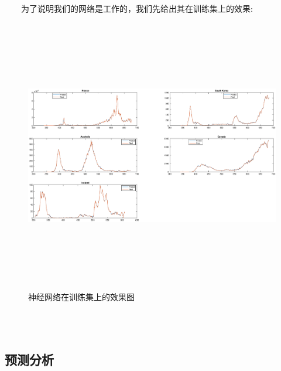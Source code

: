 \documentclass[a4paper, titlepage]{article}
\begin{document}
	　　为了说明我们的网络是工作的，我们先给出其在训练集上的效果:\\
    \vspace{-1em}
    \begin{minipage}{\textwidth}
        \begin{figure}[H]
            \centering
	        \includegraphics[height=12cm, width=14cm]{./images/Chapter5/trainset.eps}
            \vspace{-2em}
            \caption{神经网络在训练集上的效果图}
	    \end{figure}
    \end{minipage}\\\quad\\
    \subsection{预测分析}
\end{document}
